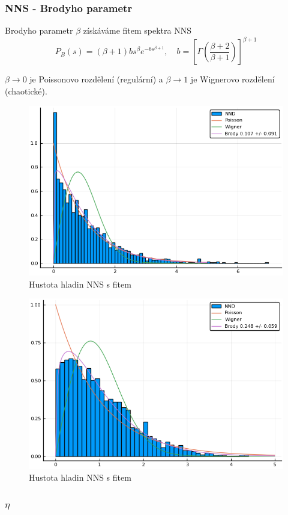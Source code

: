 \documentclass{article}
\begin{document}
\subsubsection{NNS - Brodyho parametr}
Brodyho parametr $\beta$ získáváme fitem spektra NNS 
$$P_{B}(s)=(\beta+1) b s^{\beta} e^{-b s^{\beta+1}}, \quad b=\left[\Gamma\left(\frac{\beta+2}{\beta+1}\right)\right]^{\beta+1}$$

$\beta \rightarrow 0$ je Poissonovo rozdělení (regulární) a $\beta \rightarrow 1$ je Wignerovo rozdělení (chaotické). 

\begin{figure}[H]
    \centering
    \includegraphics[width=.75\linewidth]{nns.png}
    \caption{Hustota hladin NNS s fitem}
  \end{figure}

  \begin{figure}[H]
    \centering
    \includegraphics[width=.75\linewidth]{nns2.png}
    \caption{Hustota hladin NNS s fitem}
  \end{figure}

  \subsubsection{$\eta$}
\end{document}
